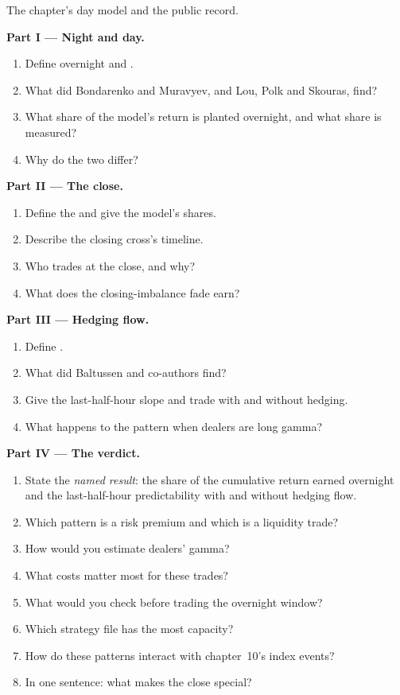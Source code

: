\begin{problem}\label{pb:s1:intraday-patterns:1}
The chapter's day model and the public record.

\medskip\noindent\textbf{Part I --- Night and day.}
\begin{enumerate}
\item Define overnight and .
\item What did Bondarenko and Muravyev, and Lou, Polk and Skouras, find?
\item What share of the model's return is planted overnight, and what share is measured?
\item Why do the two differ?
\end{enumerate}

\medskip\noindent\textbf{Part II --- The close.}
\begin{enumerate}[resume]
\item Define the  and give the model's shares.
\item Describe the closing cross's timeline.
\item Who trades at the close, and why?
\item What does the closing-imbalance fade earn?
\end{enumerate}

\medskip\noindent\textbf{Part III --- Hedging flow.}
\begin{enumerate}[resume]
\item Define .
\item What did Baltussen and co-authors find?
\item Give the last-half-hour slope and trade with and without hedging.
\item What happens to the pattern when dealers are long gamma?
\end{enumerate}

\medskip\noindent\textbf{Part IV --- The verdict.}
\begin{enumerate}[resume]
\item State the \emph{named result}: the share of the cumulative return earned overnight and the last-half-hour predictability with and without hedging
flow.
\item Which pattern is a risk premium and which is a liquidity trade?
\item How would you estimate dealers' gamma?
\item What costs matter most for these trades?
\item What would you check before trading the overnight window?
\item Which strategy file has the most capacity?
\item How do these patterns interact with chapter~10's index events?
\item In one sentence: what makes the close special?
\end{enumerate}
\end{problem}

